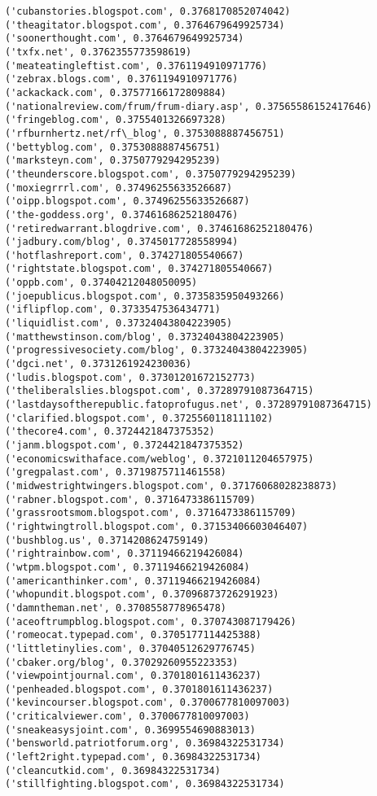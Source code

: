 \documentclass[11pt]{article}
\begin{document}
\begin{Verbatim}[commandchars=\\\{\}]
('cubanstories.blogspot.com', 0.3768170852074042)
('theagitator.blogspot.com', 0.3764679649925734)
('soonerthought.com', 0.3764679649925734)
('txfx.net', 0.3762355773598619)
('meateatingleftist.com', 0.3761194910971776)
('zebrax.blogs.com', 0.3761194910971776)
('ackackack.com', 0.37577166172809884)
('nationalreview.com/frum/frum-diary.asp', 0.37565586152417646)
('fringeblog.com', 0.3755401326697328)
('rfburnhertz.net/rf\_blog', 0.3753088887456751)
('bettyblog.com', 0.3753088887456751)
('marksteyn.com', 0.3750779294295239)
('theunderscore.blogspot.com', 0.3750779294295239)
('moxiegrrrl.com', 0.37496255633526687)
('oipp.blogspot.com', 0.37496255633526687)
('the-goddess.org', 0.37461686252180476)
('retiredwarrant.blogdrive.com', 0.37461686252180476)
('jadbury.com/blog', 0.3745017728558994)
('hotflashreport.com', 0.374271805540667)
('rightstate.blogspot.com', 0.374271805540667)
('oppb.com', 0.37404212048050095)
('joepublicus.blogspot.com', 0.3735835950493266)
('iflipflop.com', 0.3733547536434771)
('liquidlist.com', 0.37324043804223905)
('matthewstinson.com/blog', 0.37324043804223905)
('progressivesociety.com/blog', 0.37324043804223905)
('dgci.net', 0.3731261924230036)
('ludis.blogspot.com', 0.37301201672152773)
('theliberalslies.blogspot.com', 0.37289791087364715)
('lastdaysoftherepublic.fatoprofugus.net', 0.37289791087364715)
('clarified.blogspot.com', 0.3725560118111102)
('thecore4.com', 0.3724421847375352)
('janm.blogspot.com', 0.3724421847375352)
('economicswithaface.com/weblog', 0.3721011204657975)
('gregpalast.com', 0.3719875711461558)
('midwestrightwingers.blogspot.com', 0.37176068028238873)
('rabner.blogspot.com', 0.3716473386115709)
('grassrootsmom.blogspot.com', 0.3716473386115709)
('rightwingtroll.blogspot.com', 0.37153406603046407)
('bushblog.us', 0.3714208624759149)
('rightrainbow.com', 0.37119466219426084)
('wtpm.blogspot.com', 0.37119466219426084)
('americanthinker.com', 0.37119466219426084)
('whopundit.blogspot.com', 0.37096873726291923)
('damntheman.net', 0.3708558778965478)
('aceoftrumpblog.blogspot.com', 0.370743087179426)
('romeocat.typepad.com', 0.3705177114425388)
('littletinylies.com', 0.37040512629776745)
('cbaker.org/blog', 0.37029260955223353)
('viewpointjournal.com', 0.3701801611436237)
('penheaded.blogspot.com', 0.3701801611436237)
('kevincourser.blogspot.com', 0.3700677810097003)
('criticalviewer.com', 0.3700677810097003)
('sneakeasysjoint.com', 0.3699554690883013)
('bensworld.patriotforum.org', 0.36984322531734)
('left2right.typepad.com', 0.36984322531734)
('cleancutkid.com', 0.36984322531734)
('stillfighting.blogspot.com', 0.36984322531734)

\end{Verbatim}
\end{document}

